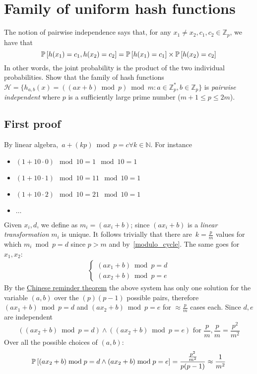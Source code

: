 \section{Family of uniform hash functions}

The notion of pairwise independence says that, for any $x_1 \neq x_2, c_1, c_2
\in \mathbb{Z}_p$, we have that
\begin{equation}
  \label{equation:pairwise-independence}
  \operatorname*{\mathbb{P}}\left[{h(x_1)= c_1, h(x_2) = c_2}\right] = \operatorname*{\mathbb{P}}\left[{h(x_1) = c_1}\right] \times \operatorname*{\mathbb{P}}\left[{h(x_2) = c_2}\right]
\end{equation}
In other words, the joint probability is the product of the two individual probabilities.
Show that the family of hash functions $\mathcal{H} = \{h_{a,b}(x) = ((ax + b) \bmod p) \bmod m :
a \in \mathbb{Z}^*_p,
b \in \mathbb{Z}_p \}$ is \emph{pairwise independent}
where $p$ is a sufficiently large prime number ($m + 1 \leq p \leq 2m$).

\subsection{First proof}

By linear algebra,~\label{modulo_cycle}$a + (kp) \bmod p = c \forall k \in \mathbb{N}$.
For instance
\begin{itemize}
	\item $(1 + 10 \cdot 0) \mod 10 = 1 \mod 10 = 1$
	\item $(1 + 10 \cdot 1) \mod 10 = 11 \mod 10 = 1$
	\item $(1 + 10 \cdot 2) \mod 10 = 21 \mod 10 = 1$
	\item $\dots$
\end{itemize}

Given $x_{i}, d$, we define as $m_{i} = (a x_{i} + b)$; since $(a x_{i} + b)$ is a \emph{linear transformation} $m_{i}$ is unique.
It follows trivially that there are~\label{p_over_m}$k = \frac{p}{m}$ values for which $m_{i} \bmod p = d$ since $p > m$ and by~\ref{modulo_cycle}.
The same goes for $x_{1}, x_{2}$:
\begin{gather*}
  \begin{cases}
    (a x_{1} + b) \bmod p = d \\
    (a x_{2} + b) \bmod p = e
  \end{cases}
\end{gather*}
By the \href{http://en.wikipedia.org/wiki/Chinese_remainder_theorem}{Chinese reminder theorem} the above system has only one solution for the variable $(a, b)$ over the $(p)(p - 1)$ possible pairs, therefore $(a x_{1} + b) \bmod p = d$ and $(a x_{2} + b) \bmod p = e$ for $\approx \frac{p}{m}$ cases each.
Since $d, e$ are independent
\begin{equation*}
  ((a x_{2} + b) \bmod p = d) \wedge ((a x_{2} + b) \bmod p = e) \textrm{ for }
  \frac{p}{m}, \frac{p}{m} = \frac{p^{2}}{m^{2}}
\end{equation*}
Over all the possible choices of $(a, b)$:
\begin{equation*}
  \operatorname*{\mathbb{P}}\left[{(a x_{2} + b) \bmod p = d \wedge  (a x_{2} + b) \bmod p = e}\right] = \frac{\frac{p^{2}}{m^{2}}}{p(p - 1)} \approx \frac{1}{m^2}
\end{equation*}


